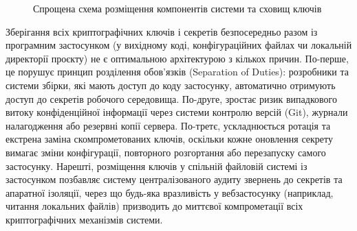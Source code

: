 \begin{figure}[H]
\centering
{}
\caption{Спрощена схема розміщення компонентів системи та сховищ ключів}
\label{fig:kms_arch}
\end{figure}

Зберігання всіх криптографічних ключів і секретів безпосередньо разом із програмним застосунком (у
вихідному коді, конфігураційних файлах чи локальній директорії проєкту) не є оптимальною архітектурою з
кількох причин. По-перше, це порушує принцип розділення обов'язків (Separation of Duties): розробники та
системи збірки, які мають доступ до коду застосунку, автоматично отримують доступ до секретів робочого
середовища. По-друге, зростає ризик випадкового витоку конфіденційної інформації через системи контролю
версій (Git), журнали налагодження або резервні копії сервера. По-третє, ускладнюється ротація та екстрена
заміна скомпрометованих ключів, оскільки кожне оновлення секрету вимагає зміни конфігурації, повторного
розгортання або перезапуску самого застосунку. Нарешті, розміщення ключів у спільній файловій системі із
застосунком позбавляє систему централізованого аудиту звернень до секретів та апаратної ізоляції, через що
будь-яка вразливість у вебзастосунку (наприклад, читання локальних файлів) призводить до миттєвої
компрометації всіх криптографічних механізмів системи.
